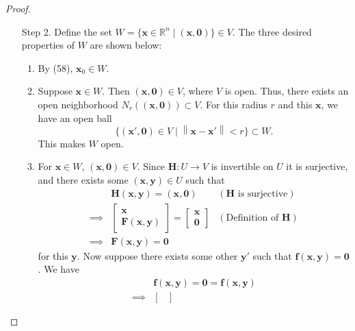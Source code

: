 \documentclass{article}
\newcommand{\R}{\mathbb{R}}
\newcommand{\x}{\mathbf{x}}
\newcommand{\F}{\mathbf{F}}
\newcommand{\f}{\mathbf{f}}
\newcommand{\y}{\mathbf{y}}
\newcommand{\ze}{\mathbf{0}}
\newcommand{\norm}[1]{\left\lVert#1\right\rVert}
\theoremstyle{definition}
\begin{document}
\begin{proof}
\begin{enumerate}
 By the inverse function theorem (Theorem 9.7), there exists open sets $ U,V\subset \R^{n+m} $ with $ (\x_0,\y_0)\in U $, $ \mathbf H(\x_0,\y_0)\in V $, such that $ \mathbf H $ is invertible on $ U $.\footnote{The inverse function theorem also gives $ V=\mathbf H(U) $.} Because $ \F(\x_0,\y_0) = \ze$, 
 \begin{equation}\label{key}
 	\mathbf H(\x_0,\y_0)= \begin{bmatrix}
 		\x_0 \\ \F(\x_0,\y_0)
 	\end{bmatrix} = \begin{bmatrix}
 		\x_0 \\ \ze 
 	\end{bmatrix} = (\x_0, \ze)\in V
 \end{equation} 

\item[Step 2.]  Define the set $ W =\{\x\in\R^n\mid (\x,\ze)\}\in V $. The three desired properties of $ W $ are shown below:
\begin{enumerate}
	\item By (58), $ \x_0\in W $. 
	\item Suppose $ \x \in W $. Then $ (\x,\ze)\in V $, where $ V $ is open. Thus, there exists an open neighborhood $ N_r((\x,\ze)) \subset V$. For this radius $ r $ and this $ \x $, we have an open ball $$ \{(\x',\ze) \in V \mid \norm{\x - \x'} < r\}\subset W .$$ This makes $ W $ open.  
 	\item For $ \x\in W $, $ (\x,\ze)\in V $. Since $ \mathbf H:U\to V $ is invertible on $ U $ it is surjective, and there exists some $ (\x,\y)\in U $ such that 
 	\begin{align*}
 		&\mathbf H(\x,\y) = (\x,\ze) & (\mathbf H \text{ is surjective})\\
 		\implies & \begin{bmatrix} \x \\ \F(\x,\y) \end{bmatrix}  = \begin{bmatrix}
 			\x \\ \ze 
 		\end{bmatrix} & (\text{Definition of } \mathbf H)\\
 	\implies & \F(\x,\y) = \ze
 	\end{align*}
 for this $ \y $. Now suppose there exists some other $ \y' $ such that $ \f(\x,\y)=\ze $. We have 
 \begin{align*}
 &	\f(\x,\y)=\ze=\f(\x,\y)\\
 \implies & \begin{bmatrix}

\end{bmatrix}
\end{align*}
\end{enumerate}
\end{enumerate}
\end{proof}
\end{document}
